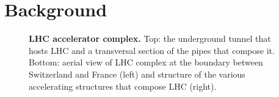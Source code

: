 \section{Background}
\begin{figure}
    \centering
    
    \caption{\textbf{LHC accelerator complex.} Top: the underground tunnel that hosts LHC and a transversal section of the pipes that compose it. 
    Bottom: aerial view of LHC complex at the boundary between Switzerland and France (left) and structure of the various accelerating structures that compose LHC (right).
    }
    \label{fig:lhc}
\end{figure}

